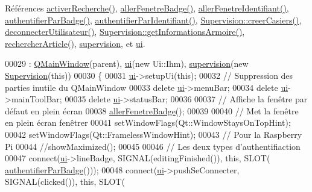 Références \hyperlink{_ihm_8cpp_source_l00244}{activer\+Recherche()}, \hyperlink{_ihm_8cpp_source_l00169}{aller\+Fenetre\+Badge()}, \hyperlink{_ihm_8cpp_source_l00180}{aller\+Fenetre\+Identifiant()}, \hyperlink{_ihm_8cpp_source_l00119}{authentifier\+Par\+Badge()}, \hyperlink{_ihm_8cpp_source_l00139}{authentifier\+Par\+Identifiant()}, \hyperlink{_supervision_8cpp_source_l00090}{Supervision\+::creer\+Casiers()}, \hyperlink{_ihm_8cpp_source_l00159}{deconnecter\+Utilisateur()}, \hyperlink{_supervision_8cpp_source_l00111}{Supervision\+::get\+Informations\+Armoire()}, \hyperlink{_ihm_8cpp_source_l00256}{rechercher\+Article()}, \hyperlink{_ihm_8h_source_l00100}{supervision}, et \hyperlink{_ihm_8h_source_l00099}{ui}.


\begin{DoxyCode}
00029                         : \hyperlink{class_q_main_window}{QMainWindow}(parent), \hyperlink{class_ihm_a0ac5f47856566ceeeca1720109bf70ea}{ui}(\textcolor{keyword}{new} Ui::Ihm), 
      \hyperlink{class_ihm_a454ab89ced1b27fcb42d550e443e780c}{supervision}(\textcolor{keyword}{new} \hyperlink{class_supervision}{Supervision}(\textcolor{keyword}{this}))
00030 \{
00031     \hyperlink{class_ihm_a0ac5f47856566ceeeca1720109bf70ea}{ui}->setupUi(\textcolor{keyword}{this});
00032     \textcolor{comment}{// Suppression des parties inutile du QMainWindow}
00033     \textcolor{keyword}{delete} \hyperlink{class_ihm_a0ac5f47856566ceeeca1720109bf70ea}{ui}->menuBar;
00034     \textcolor{keyword}{delete} \hyperlink{class_ihm_a0ac5f47856566ceeeca1720109bf70ea}{ui}->mainToolBar;
00035     \textcolor{keyword}{delete} \hyperlink{class_ihm_a0ac5f47856566ceeeca1720109bf70ea}{ui}->statusBar;
00036 
00037     \textcolor{comment}{// Affiche la fenêtre par défaut en plein écran}
00038     \hyperlink{class_ihm_a08d82e976e48a2f8fced132a4ba22049}{allerFenetreBadge}();
00039 
00040     \textcolor{comment}{// Met la fenêtre en plein écran fenêtrer}
00041     setWindowFlags(Qt::WindowStaysOnTopHint);
00042     setWindowFlags(Qt::FramelessWindowHint);
00043     \textcolor{comment}{// Pour la Raspberry Pi}
00044     \textcolor{comment}{//showMaximized();}
00045 
00046     \textcolor{comment}{// Les deux types d'authentifiaction}
00047     connect(\hyperlink{class_ihm_a0ac5f47856566ceeeca1720109bf70ea}{ui}->lineBadge, SIGNAL(editingFinished()), \textcolor{keyword}{this}, SLOT(
      \hyperlink{class_ihm_abf037b73a8416097f768dd6eb7e20e0e}{authentifierParBadge}()));
00048     connect(\hyperlink{class_ihm_a0ac5f47856566ceeeca1720109bf70ea}{ui}->pushSeConnecter, SIGNAL(clicked()), \textcolor{keyword}{this}, SLOT(

\end{DoxyCode}
